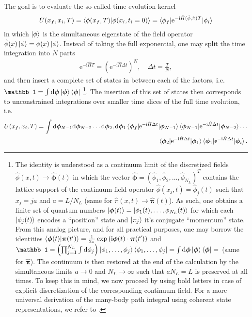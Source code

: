 \documentclass{svmono}
\def\ri{\mathrm i}
\def\re{\mathrm e}
\def\rd{\mathrm d}
\newcommand{\brlr}[1]{\left( #1 \right)}
\begin{document}
The goal is to evaluate the so-called time evolution kernel
\begin{align}
    U(x_f,x_i,T) = \braket{\phi(x_f,T)|\phi(x_i,t_i=0)}=\braket{\phi_f|\re^{-\ri\hat H(\hat\phi,\hat\pi) T}|\phi_i}
    \label{eq:time_evolution_kernel}
\end{align}
in which $\ket{\phi}$ is the simultaneous eigenstate of the field operator $\hat\phi(x)\ket{\phi}=\phi(x)\ket{\phi}$.
Instead of taking the full exponential, one may split the time integration into $N$ parts
\begin{align}
    \re^{-\ri\hat HT}=\brlr{\re^{-\ri\hat H\Delta t}}^N
    ,
    \quad
    \Delta t = \frac TN
    ,
\end{align}
and then insert a complete set of states in between each of the factors, i.e. $\mathbb 1=\int\rd\bm\phi\ket{\bm\phi}\bra{\bm\phi}$
\footnote{
    The identity is understood as a continuum limit of the discretized fields $\hat\phi(x,t)\rightarrow{\hat{\bm\phi}}(t)$ in which the vector $\hat{\bm\phi}=(\hat\phi_1,\hat\phi_2,\dots,\hat\phi_{N_L})^T$ contains the lattice support of the continuum field operator $\hat\phi(x_j,t)=\hat\phi_j(t)$ such that $x_j=ja$ and $a=L/N_L$ (same for $\hat\pi(x,t)\rightarrow\hat{\bm\pi}(t)$).
    As such, one obtains a finite set of quantum numbers $\ket{\bm\phi(t)}=\ket{\phi_1(t),\dots,\phi_{N_L}(t)}$ for which each $\ket{\phi_j(t)}$ encodes a ``position'' state and $\ket{\pi_j}$ it's conjugate ``momentum'' state.
    From this analog picture, and for all practical purposes, one may borrow the identities $\braket{\bm\phi(t)|\bm\pi(t')}=\frac1{2\pi}\exp\brlr{\ri\bm\phi(t)\cdot\bm\pi(t')}$ and $\mathbb1=\brlr{\prod_{j=1}^{N_L}\int\rd\phi_j}\ket{\phi_1,\dots,\phi_j}\bra{\phi_1,\dots,\phi_j}=\int\rd\bm\phi\ket{\bm\phi}\bra{\bm\phi}=$ (same for $\hat{\bm\pi}$).
    The continuum is then restored at the end of the calculation by the simultaneous limits $a\rightarrow0$ and $N_L\rightarrow\infty$ such that $aN_L=L$ is preserved at all times.
    To keep this in mind, we now proceed by using bold letters in case of explicit discretization of the corresponding continuum field.
    For a more universal derivation of the many-body path integral using coherent state representations, we refer to \cite{AltlandSimons2010}.
}.
The insertion of this set of states then corresponds to unconstrained integrations over smaller time slices of the full time evolution, i.e.
\begin{align}
    U(x_f,x_i,T) =
    \int{\rd{\bm\phi}_{N-1}\rd{\bm\phi}_{N-2}\dots\rd{\bm\phi}_2,\rd{\bm\phi}_1}
    \braket{\bm\phi_f|\re^{-\ri\hat H\Delta t}|\bm\phi_{N-1}}
    \braket{\bm\phi_{{N-1}}|\re^{-\ri\hat H\Delta t}|\bm\phi_{{N-2}}}
    \dots
    \nonumber\\
    \braket{\bm\phi_{2}|\re^{-\ri\hat H\Delta t}|\bm\phi_{1}}
    \braket{\bm\phi_{1}|\re^{-\ri\hat H\Delta t}|\bm\phi_i}.
\end{align}
\end{document}
